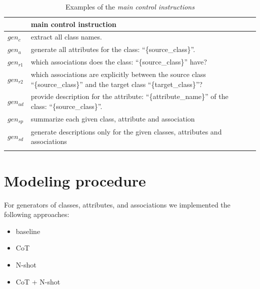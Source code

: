 \begin{table}[!h]
    \scriptsize
    \centering
    \setlength{\tabcolsep}{0.5em}
\begin{tabular}{@{}l>{\raggedright\arraybackslash}p{}>{\raggedright\arraybackslash}p{}@{}}
         & main control instruction \\
    \toprule
    \addlinespace
    
$gen_c$ & extract all class names. \\
\addlinespace

$gen_a$ & generate all attributes for the class: ``\{source\_class\}''. \\
\addlinespace

$gen_{r1}$ & which associations does the class: ``\{source\_class\}'' have? \\
\addlinespace

$gen_{r2}$ & which associations are explicitly between the source class ``\{source\_class\}'' and the target class ``\{target\_class\}''? \\
\addlinespace

$gen_{ad}$ & provide description for the attribute: ``\{attribute\_name\}'' of the class: ``\{source\_class\}''. \\
\addlinespace

$gen_{sp}$ & summarize each given class, attribute and association \\
\addlinespace

$gen_{sd}$ & generate descriptions only for the given classes, attributes and associations \\
\addlinespace

	\bottomrule
	\addlinespace
	\end{tabular}
	\caption{Examples of the \emph{main control instructions}}
	\label{tab:main-control-instructions}
\end{table}


\section{Modeling procedure}

For generators of classes, attributes, and associations we implemented the following approaches:

\begin{itemize}
\item baseline
\item CoT
\item N-shot
\item CoT + N-shot
\end{itemize}


